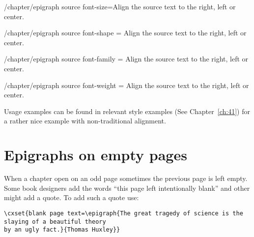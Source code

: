 \begin{key}{/chapter/epigraph source font-size=}Align the source text to the right, left or center.
\end{key}

\begin{key}{/chapter/epigraph source font-shape = }
Align the source text to the right, left or center.
\end{key}

\begin{key}{/chapter/epigraph source font-family = }Align the source text to the right, left or center.
\end{key}


\begin{key}{/chapter/epigraph source font-weight = }
Align the source text to the right, left or center.
\end{key}


Usage examples can be found in relevant style examples (See Chapter~\ref{ch:41}) for a rather 
nice example with non-traditional alignment.

\section{Epigraphs on empty pages}

When a chapter open on an odd page sometimes the  previous page is left empty. Some book designers 
add the words ``this page left intentionally blank'' and other might add a quote. To add such a quote use:

\begin{tcolorbox}
\begin{lstlisting}
\cxset{blank page text=\epigraph{The great tragedy of science is the slaying of a beautiful theory
by an ugly fact.}{Thomas Huxley}}
\end{lstlisting}
\end{tcolorbox}

